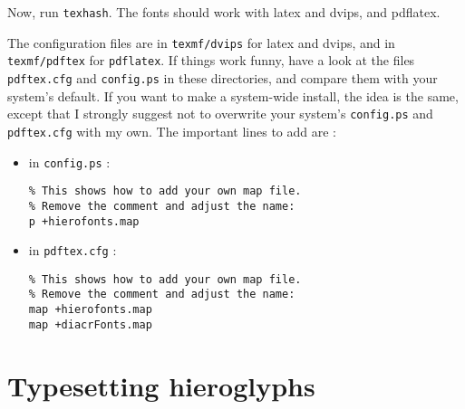 \documentclass[final]{article}
\begin{document}
Now, run \texttt{texhash}. The fonts should work with latex and dvips, and pdflatex.

The configuration files are in \texttt{texmf/dvips} for latex and
dvips, and in \texttt{texmf/pdftex} for \texttt{pdflatex}.  If things
work funny, have a look at the files \texttt{pdftex.cfg} and
\texttt{config.ps} in these directories, and compare them with your
system's default. If you want to make a system-wide install, the idea
is the same, except that I strongly suggest not to overwrite your
system's \texttt{config.ps} and \texttt{pdftex.cfg} with my own. The important lines to add are :
\begin{itemize}
\item in \texttt{config.ps} :
\begin{verbatim}
% This shows how to add your own map file.
% Remove the comment and adjust the name:
p +hierofonts.map
\end{verbatim}

\item in \texttt{pdftex.cfg} :
\begin{verbatim}
% This shows how to add your own map file. 
% Remove the comment and adjust the name:
map +hierofonts.map
map +diacrFonts.map
\end{verbatim}
\end{itemize}

\section{Typesetting hieroglyphs}



\end{document}
